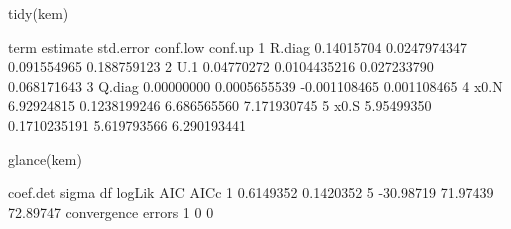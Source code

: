 \begin{Schunk}
\begin{Sinput}
 tidy(kem)
\end{Sinput}
\begin{Soutput}
    term   estimate    std.error     conf.low     conf.up
1 R.diag 0.14015704 0.0247974347  0.091554965 0.188759123
2    U.1 0.04770272 0.0104435216  0.027233790 0.068171643
3 Q.diag 0.00000000 0.0005655539 -0.001108465 0.001108465
4   x0.N 6.92924815 0.1238199246  6.686565560 7.171930745
5   x0.S 5.95499350 0.1710235191  5.619793566 6.290193441
\end{Soutput}
\begin{Sinput}
 glance(kem)
\end{Sinput}
\begin{Soutput}
   coef.det     sigma df    logLik      AIC     AICc
1 0.6149352 0.1420352  5 -30.98719 71.97439 72.89747
  convergence errors
1           0      0
\end{Soutput}
\end{Schunk}
